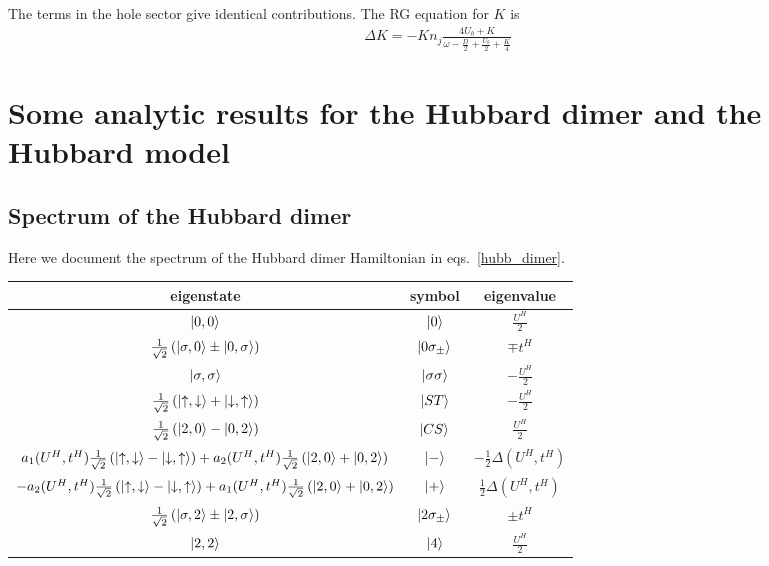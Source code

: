 \documentclass[10pt]{report}
\numberwithin{equation}{section}
\begin{document}
\begin{appendices}
The terms in the hole sector give identical contributions. The RG equation for \(K\) is
\begin{equation}\begin{aligned}
	\Delta K = -K n_j\frac{4 U_b + K}{\omega - \frac{D}{2} + \frac{U_b}{2} + \frac{K}{4}}
\end{aligned}\end{equation}

\chapter{Some analytic results for the Hubbard dimer and the Hubbard model}
\section{Spectrum of the Hubbard dimer}
Here we document the spectrum of the Hubbard dimer Hamiltonian in eqs.~\ref{hubb_dimer}.
\begin{center}
	\begin{tabular}{|c|c|c|}
	\hline
	eigenstate & symbol & eigenvalue \\
	\hline
	$\ket{0,0}$ & $\ket{0}$ & \( \frac{U^H}{2}\)\\
	$ \frac{1}{\sqrt 2}\left(\ket{\sigma,0} \pm \ket{0,\sigma}\right)$ & $\ket{0\sigma_\pm}$ & \(\mp t^H\)\\
	$\ket{\sigma,\sigma}$ & $\ket{\sigma\sigma}$ & \( -\frac{U^H}{2}\)\\
	$ \frac{1}{\sqrt 2}\left(\ket{\uparrow,\downarrow} + \ket{\downarrow,\uparrow}\right)$ & $\ket{ST}$ & \( -\frac{U^H}{2}\)\\
	$ \frac{1}{\sqrt 2}\left(\ket{2,0} - \ket{0,2}\right)$ & $\ket{CS}$ & \( \frac{U^H}{2}\)\\
	$a_1(U^H, t^H) \frac{1}{\sqrt 2}\left(\ket{\uparrow,\downarrow} - \ket{\downarrow,\uparrow}\right) + a_2(U^H, t^H)\frac{1}{\sqrt 2}\left(\ket{2,0} + \ket{0,2}\right)$ & $\ket{-}$ & \(-\frac{1}{2}\Delta(U^H, t^H)\)\\
	$-a_2(U^H, t^H) \frac{1}{\sqrt 2}\left(\ket{\uparrow,\downarrow} - \ket{\downarrow,\uparrow}\right) + a_1(U^H, t^H)\frac{1}{\sqrt 2}\left(\ket{2,0} + \ket{0,2}\right)$ & $\ket{+}$ & \(\frac{1}{2}\Delta(U^H, t^H)\)\\
	$ \frac{1}{\sqrt 2}\left(\ket{\sigma,2} \pm \ket{2,\sigma}\right)$ & $\ket{2\sigma_\pm}$ & \(\pm t^H\)\\
	$\ket{2,2}$ & $\ket{4}$ & \( \frac{U^H}{2}\)\\
\hline
	\end{tabular}
	\label{hubb_dim_spectrum}
\end{center}


\end{appendices}
\end{document}
